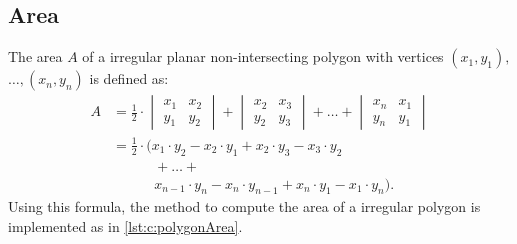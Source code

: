 \subsection*{Area}
The area $A$ of a irregular planar non-intersecting polygon with vertices $(x_1, y_1),$ $\ldots, (x_n, y_n)$ is defined as:
	\begin{equation}\label{e:barwq}
		\begin{split}
		A 	&= \frac{1}{2} \cdot
				\begin{vmatrix}x_1 & x_2\\y_1 & y_2\end{vmatrix} +
				\begin{vmatrix}x_2 & x_3\\y_2 & y_3\end{vmatrix} +
				\ldots +
				\begin{vmatrix}x_n & x_1\\y_n & y_1\end{vmatrix}\\		
		~	&=					\frac{1}{2} \cdot(
							x_1 \cdot y_2 - 
							x_2 \cdot y_1 + 
							x_2 \cdot y_3 -
							x_3 \cdot y_2\\
			&	\quad\quad\quad		+ \ldots + \\
			&	\quad\quad\quad		x_{n-1} \cdot y_n -
							x_n \cdot y_{n-1} +
							x_n \cdot y_1 -
							x_1 \cdot y_n).
		\end{split}
	\end{equation}
Using this formula, the method to compute the area of a irregular polygon is implemented as in \autoref{lst:c:polygonArea}.

